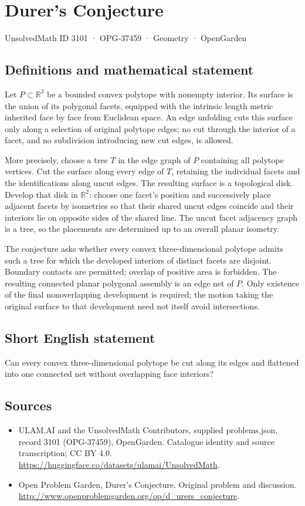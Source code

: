 \documentclass[11pt,a4paper]{article}
\begin{document}
\section*{Durer's Conjecture}\label{3101}
{\small UnsolvedMath ID 3101 · OPG-37459 · Geometry · OpenGarden}
\subsection{Definitions and mathematical statement}
Let $P\subset\mathbb R^3$ be a bounded convex polytope with nonempty interior. Its surface is the union of its polygonal facets, equipped with the intrinsic length metric inherited face by face from Euclidean space. An edge unfolding cuts this surface only along a selection of original polytope edges; no cut through the interior of a facet, and no subdivision introducing new cut edges, is allowed.

More precisely, choose a tree $T$ in the edge graph of $P$ containing all polytope vertices. Cut the surface along every edge of $T$, retaining the individual facets and the identifications along uncut edges. The resulting surface is a topological disk. Develop that disk in $\mathbb R^2$: choose one facet's position and successively place adjacent facets by isometries so that their shared uncut edges coincide and their interiors lie on opposite sides of the shared line. The uncut facet adjacency graph is a tree, so the placements are determined up to an overall planar isometry.

The conjecture asks whether every convex three-dimensional polytope admits such a tree for which the developed interiors of distinct facets are disjoint. Boundary contacts are permitted; overlap of positive area is forbidden. The resulting connected planar polygonal assembly is an edge net of $P$. Only existence of the final nonoverlapping development is required; the motion taking the original surface to that development need not itself avoid intersections.
\subsection{Short English statement}
Can every convex three-dimensional polytope be cut along its edges and flattened into one connected net without overlapping face interiors?
\subsection{Sources}
\begin{itemize}
\item[S1] ULAM.AI and the UnsolvedMath Contributors, supplied problems.json, record 3101 (OPG-37459), OpenGarden. Catalogue identity and source transcription; CC BY 4.0.
\url{https://huggingface.co/datasets/ulamai/UnsolvedMath}.
\item[S2] Open Problem Garden, Durer's Conjecture. Original problem and discussion.
\url{http://www.openproblemgarden.org/op/d_urers_conjecture}.
\end{itemize}
\end{document}
